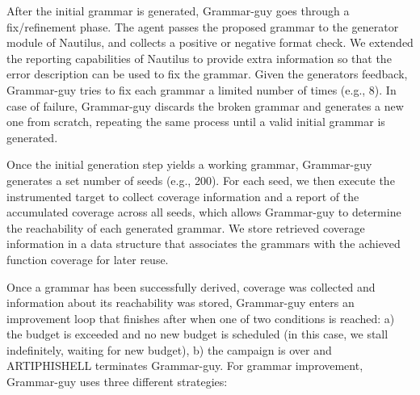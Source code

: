 

%

After the initial grammar is generated, Grammar-guy goes through a fix/refinement phase. The agent passes the proposed grammar to the generator module of Nautilus, and collects a positive or negative format check. We extended the reporting capabilities of Nautilus to provide extra information so that the error description can be used to fix the grammar. Given the generators feedback, Grammar-guy tries to fix each grammar a limited number of times (e.g., 8). In case of failure, Grammar-guy discards the broken grammar and generates a new one from scratch, repeating the same process until a valid initial grammar is generated.

Once the initial generation step yields a working grammar, Grammar-guy generates a set number of seeds (e.g., 200). For each seed, we  then execute the instrumented target to collect coverage information and a report of the accumulated coverage across all seeds, which allows Grammar-guy to determine the reachability of each generated grammar. We store retrieved coverage information in a data structure that associates the grammars with the achieved function coverage for later reuse.

Once a grammar has been successfully derived, coverage was collected and information about its reachability was stored, Grammar-guy enters an improvement loop that finishes after when one of two conditions is reached: a) the budget is exceeded and no new budget is scheduled (in this case, we stall indefinitely, waiting for new budget), b) the campaign is over and ARTIPHISHELL terminates Grammar-guy.
For grammar improvement, Grammar-guy uses three different strategies:

